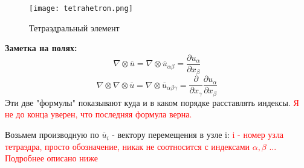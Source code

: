 \documentclass[a4paper,12pt]{article}
\begin{document}
\begin{figure}[H]
    \centering
    \texttt{[image: tetrahetron.png]}
    \caption{Тетраэдральный элемент}
    \label{fig:enter-label}
\end{figure}
\textbf{Заметка на полях:}
\begin{equation}
    \nabla \otimes \overline{u}  = \nabla \otimes \overline{u}_{\alpha \beta}= \frac{\partial u_\alpha}{\partial x_\beta}  
\end{equation}
\begin{equation}
    \nabla \otimes \nabla \otimes \overline{u}  = \nabla \otimes \overline{u}_{\alpha \beta \gamma}= \frac{\partial}{\partial x_\gamma} \frac{\partial u_\alpha}{\partial x_\beta}
\end{equation}
Эти две "формулы" показывают куда и в каком порядке расставлять индексы. \textcolor{red}{Я не до конца уверен, что последняя формула верна.}
\par
Возьмем производную по $\overline{u}_i$ - вектору перемещения в узле i:
\textcolor{red}{i - номер узла тетраэдра, просто обозначение, никак не соотносится с индексами $\alpha, \beta$ ... Подробнее описано ниже}
\end{document}
